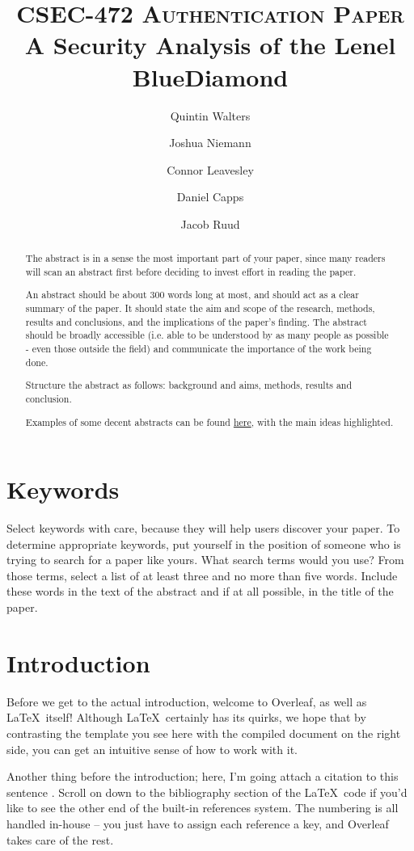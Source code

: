 \documentclass[10pt,twocolumn,letterpaper]{article}
\title{
		\vspace{-1in} 	
		\usefont{OT1}{bch}{b}{n}
		\normalfont \normalsize \textsc{CSEC-472 Authentication Paper} \\ [14pt]
		\huge A Security Analysis of the Lenel BlueDiamond \\
}
\author[1]{Quintin Walters}
\author[1]{Joshua Niemann}
\author[1]{Connor Leavesley}
\author[1]{Daniel Capps}
\author[1]{Jacob Ruud}
\affil[1]{\small{Computing Security, Rochester Institute of Technology}}
\begin{document}
\maketitle
{}
\begin{abstract}
The abstract is in a sense the most important part of your paper, since many readers will scan an abstract first before deciding to invest effort in reading the paper.

An abstract should be about 300 words long at most, and should act as a clear summary of the paper. It should state the aim and scope of the research, methods, results and conclusions, and the implications of the paper’s finding. The abstract should be broadly accessible (i.e. able to be understood by as many people as possible - even those outside the field) and communicate the importance of the work being done. 

Structure the abstract as follows: background and aims, methods, results and conclusion. 

Examples of some decent abstracts can be found \href{http://journal.stemfellowship.org/userimages/ContentEditor/1451371646443/AbstractExamples.pdf}{here}, with the main ideas highlighted.
\end{abstract} 

\section*{Keywords}
Select keywords with care, because they will help users discover your paper. To determine appropriate keywords, put yourself in the position of someone who is trying to search for a paper like yours. What search terms would you use? From those terms, select a list of at least three and no more than five words. Include these words in the text of the abstract and if at all possible, in the title of the paper.

\section{Introduction}
Before we get to the actual introduction, welcome to Overleaf, as well as \LaTeX\ itself! Although \LaTeX\ certainly has its quirks, we hope that by contrasting the template you see here with the compiled document on the right side, you can get an intuitive sense of how to work with it.

Another thing before the introduction; here, I'm going attach a citation to this sentence \cite{latexcompanion}. Scroll on down to the bibliography section of the \LaTeX\ code if you'd like to see the other end of the built-in references system. The numbering is all handled in-house -- you just have to assign each reference a key, and Overleaf takes care of the rest.
\end{document}
